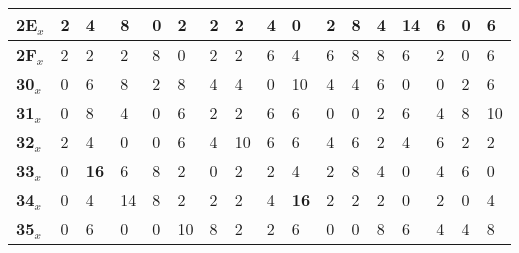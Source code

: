 \begin{longtable}[c]{|l|l|l|l|l|l|l|l|l|l|l|l|l|l|l|l|l|}
\textbf{2E$_x$} & 2              & 4              & 8              & 0              & 2              & 2              & 2              & 4              & 0              & 2              & 8              & 4              & 14             & 6              & 0              & 6              \\ \hline
\textbf{2F$_x$} & 2              & 2              & 2              & 8              & 0              & 2              & 2              & 6              & 4              & 6              & 8              & 8              & 6              & 2              & 0              & 6              \\ \hline
\textbf{30$_x$} & 0              & 6              & 8              & 2              & 8              & 4              & 4              & 0              & 10             & 4              & 4              & 6              & 0              & 0              & 2              & 6              \\ \hline
\textbf{31$_x$} & 0              & 8              & 4              & 0              & 6              & 2              & 2              & 6              & 6              & 0              & 0              & 2              & 6              & 4              & 8              & 10             \\ \hline
\textbf{32$_x$} & 2              & 4              & 0              & 0              & 6              & 4              & 10             & 6              & 6              & 4              & 6              & 2              & 4              & 6              & 2              & 2              \\ \hline
\textbf{33$_x$} & 0              & \textbf{16}             & 6              & 8              & 2              & 0              & 2              & 2              & 4              & 2              & 8              & 4              & 0              & 4              & 6              & 0              \\ \hline
\textbf{34$_x$} & 0              & 4              & 14             & 8              & 2              & 2              & 2              & 4              & \textbf{16}             & 2              & 2              & 2              & 0              & 2              & 0              & 4              \\ \hline
\textbf{35$_x$} & 0              & 6              & 0              & 0              & 10             & 8              & 2              & 2              & 6              & 0              & 0              & 8              & 6              & 4              & 4              & 8              \\ \hline

\end{longtable}
